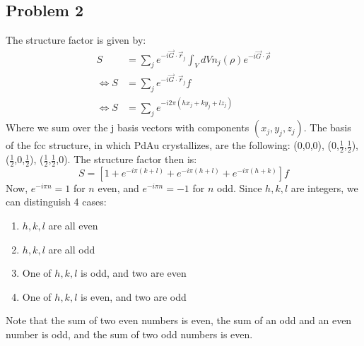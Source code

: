 \documentclass[12pt]{article}
\begin{document}
\subsection{Problem 2}
The structure factor is given by:
\begin{align}
    S &= \sum_j e^{-i\Vec{G} \cdot \Vec{r}_j} \int_V dV n_j(\rho)e^{-i\Vec{G} \cdot \Vec{\rho}} \\
    \Leftrightarrow S &= \sum_j e^{-i\Vec{G} \cdot \Vec{r}_j} f \\
    \Leftrightarrow S &= \sum_j e^{-i2\pi(hx_j + ky_j + lz_j)}
\end{align}
Where we sum over the j basis vectors with components $(x_j,y_j,z_j)$.
The basis of the fcc structure, in which PdAu crystallizes, are the following: (0,0,0), (0,$\frac{1}{2}$,$\frac{1}{2}$), ($\frac{1}{2}$,0,$\frac{1}{2}$), ($\frac{1}{2}$,$\frac{1}{2}$,0). The structure factor then is:
\begin{equation}
    S = \left[ 1 + e^{-i\pi(k+l)} + e^{-i\pi(h+l)} +e^{-i\pi(h+k)} \right] f
\end{equation}
Now, $e^{-i\pi n} = 1$ for $n$ even, and $e^{-i\pi n} = -1$ for $n$ odd. Since $h,k,l$ are integers, we can distinguish 4 cases:
\begin{enumerate}
    \item $h,k,l$ are all even
    \item $h,k,l$ are all odd
    \item One of $h,k,l$ is odd, and two are even
    \item One of $h,k,l$ is even, and two are odd
\end{enumerate}

Note that the sum of two even numbers is even, the sum of an odd and an even number is odd, and the sum of two odd numbers is even.
\end{document}

